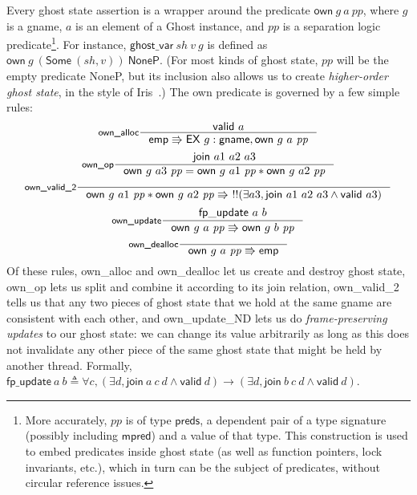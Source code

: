 \documentclass[11pt]{article}
\begin{document}
Every ghost state assertion is a wrapper around the predicate $\mathsf{own}\ g\ a\ \mathit{pp}$, where $g$ is a \textsf{gname}, $a$ is an element of a \textsf{Ghost} instance, and $\mathit{pp}$ is a separation logic predicate\footnote{More accurately, $\mathit{pp}$ is of type $\mathsf{preds}$, a dependent pair of a type signature (possibly including $\mathsf{mpred}$) and a value of that type. This construction is used to embed predicates inside ghost state (as well as function pointers, lock invariants, etc.), which in turn can be the subject of predicates, without circular reference issues.}. For instance, $\mathsf{ghost\_var}\ \mathit{sh}\ v\ g$ is defined as $\mathsf{own}\ g\ (\mathsf{Some}\ (\mathit{sh}, v))\ \mathsf{NoneP}$. (For most kinds of ghost state, $\mathit{pp}$ will be the empty predicate \textsf{NoneP}, but its inclusion also allows us to create \emph{higher-order ghost state}, in the style of Iris~\cite{hogs}.) The \textsf{own} predicate is governed by a few simple rules:
$$\inference[\textsf{own\_alloc}]{\mathsf{valid}\ a}{\mathsf{emp} \Rrightarrow \mathsf{EX}\ g : \mathsf{gname}, \mathsf{own}\ g\ a\ \mathit{pp}}$$
$$\inference[\textsf{own\_op}]{\mathsf{join}\ a1\ a2\ a3}{\mathsf{own}\ g\ a3\ \mathit{pp} = \mathsf{own}\ g\ a1\ \mathit{pp} * \mathsf{own}\ g\ a2\ \mathit{pp}}$$
$$\inference[\textsf{own\_valid\_2}]{}{\mathsf{own}\ g\ a1\ \mathit{pp} * \mathsf{own}\ g\ a2\ \mathit{pp} \Rrightarrow\ !!(\exists a3, \mathsf{join}\ a1\ a2\ a3 \land \mathsf{valid}\ a3)}$$
$$\inference[\textsf{own\_update}]{\mathsf{fp\_update}\ a\ b}{\mathsf{own}\ g\ a\ \mathit{pp} \Rrightarrow \mathsf{own}\ g\ b\ \mathit{pp}}$$
$$\inference[\textsf{own\_dealloc}]{}{\mathsf{own}\ g\ a\ \mathit{pp} \Rrightarrow \mathsf{emp}}$$
Of these rules, \textsf{own\_alloc} and \textsf{own\_dealloc} let us create and destroy ghost state, \textsf{own\_op} lets us split and combine it according to its \textsf{join} relation, \textsf{own\_valid\_2} tells us that any two pieces of ghost state that we hold at the same \textsf{gname} are consistent with each other, and \textsf{own\_update\_ND} lets us do \emph{frame-preserving updates} to our ghost state: we can change its value arbitrarily as long as this does not invalidate any other piece of the same ghost state that might be held by another thread. Formally, $\mathsf{fp\_update}\ a\ b \triangleq \forall c, (\exists d, \mathsf{join}\ a\ c\ d \land \mathsf{valid}\ d) \rightarrow (\exists d, \mathsf{join}\ b\ c\ d \land \mathsf{valid}\ d)$.
\end{document}
